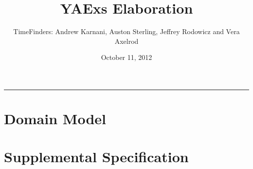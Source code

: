 \documentclass[11pt]{article}
\title{YAExs Elaboration}
\author{TimeFinders: Andrew Karnani, Auston Sterling, Jeffrey Rodowicz and Vera Axelrod}
\date{October 11, 2012}
\begin{document}
\maketitle
\tableofcontents
\vspace{0.2in}
\hrule
\vspace{1in}

\section{Domain Model}

\begin{comment}
\begin{figure}
	\centering
		\texttt{[image: DomainModel.png]}
	\caption{Domain Model}
	\label{fig:Domain}
\end{figure}
\end{comment}

\section{Supplemental Specification}
\end{document}
